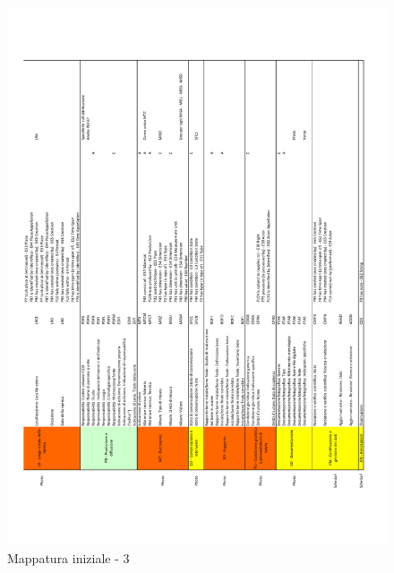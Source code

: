 \begin{center}
\begin{figure}[ht!]
    \includegraphics{images/Mapping-v3-3.pdf}
	\caption{Mappatura iniziale - 3}
	\label{fig:mapping-v3-3}
\end{figure}
\end{center}


